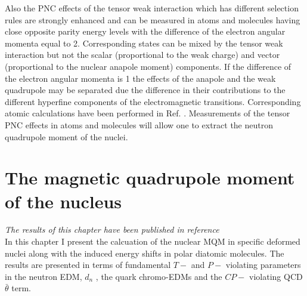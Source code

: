 \documentclass[10pt,a4paper, twoside]{report}
\begin{document}
Also the PNC effects of the tensor weak interaction which has different selection rules are strongly enhanced  and can be measured in atoms and molecules having close opposite parity energy levels with the difference of the electron angular momenta equal to 2. Corresponding states can be mixed by the tensor weak interaction but not the scalar (proportional to the  weak charge) and vector (proportional to the nuclear anapole moment) components. If the difference of the electron angular momenta is 1 the effects of the anapole and the weak quadrupole may be separated due the difference in their contributions to the different hyperfine components of the electromagnetic transitions. Corresponding atomic calculations have been performed in Ref.  \cite{FDC17}. Measurements of the tensor PNC effects in atoms and molecules will allow one to extract  the neutron quadrupole moment of the nuclei. \\

\chapter{The magnetic quadrupole moment of the nucleus} \label{chap:MQM}
\textit{The results of this chapter have been published in reference \cite{LFMQM2018}} \\
\linebreak
In this chapter I present the calcuation of the nuclear MQM in specific deformed nuclei along with the induced energy shifts in polar diatomic molecules. The results are presented in terms of fundamental $T-$ and $P-$ violating parameters in the neutron EDM, $d_n$ , the quark chromo-EDMs and the $CP-$ violating QCD $\bar{\theta}$ term.
\iffalse
\end{document}
